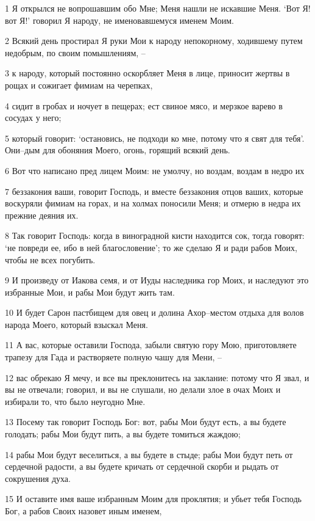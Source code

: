 \par 1 Я открылся не вопрошавшим обо Мне; Меня нашли не искавшие Меня. `Вот Я! вот Я!' говорил Я народу, не именовавшемуся именем Моим.
\par 2 Всякий день простирал Я руки Мои к народу непокорному, ходившему путем недобрым, по своим помышлениям, --
\par 3 к народу, который постоянно оскорбляет Меня в лице, приносит жертвы в рощах и сожигает фимиам на черепках,
\par 4 сидит в гробах и ночует в пещерах; ест свиное мясо, и мерзкое варево в сосудах у него;
\par 5 который говорит: `остановись, не подходи ко мне, потому что я свят для тебя'. Они--дым для обоняния Моего, огонь, горящий всякий день.
\par 6 Вот что написано пред лицем Моим: не умолчу, но воздам, воздам в недро их
\par 7 беззакония ваши, говорит Господь, и вместе беззакония отцов ваших, которые воскуряли фимиам на горах, и на холмах поносили Меня; и отмерю в недра их прежние деяния их.
\par 8 Так говорит Господь: когда в виноградной кисти находится сок, тогда говорят: `не повреди ее, ибо в ней благословение'; то же сделаю Я и ради рабов Моих, чтобы не всех погубить.
\par 9 И произведу от Иакова семя, и от Иуды наследника гор Моих, и наследуют это избранные Мои, и рабы Мои будут жить там.
\par 10 И будет Сарон пастбищем для овец и долина Ахор--местом отдыха для волов народа Моего, который взыскал Меня.
\par 11 А вас, которые оставили Господа, забыли святую гору Мою, приготовляете трапезу для Гада и растворяете полную чашу для Мени, --
\par 12 вас обрекаю Я мечу, и все вы преклонитесь на заклание: потому что Я звал, и вы не отвечали; говорил, и вы не слушали, но делали злое в очах Моих и избирали то, что было неугодно Мне.
\par 13 Посему так говорит Господь Бог: вот, рабы Мои будут есть, а вы будете голодать; рабы Мои будут пить, а вы будете томиться жаждою;
\par 14 рабы Мои будут веселиться, а вы будете в стыде; рабы Мои будут петь от сердечной радости, а вы будете кричать от сердечной скорби и рыдать от сокрушения духа.
\par 15 И оставите имя ваше избранным Моим для проклятия; и убьет тебя Господь Бог, а рабов Своих назовет иным именем,

